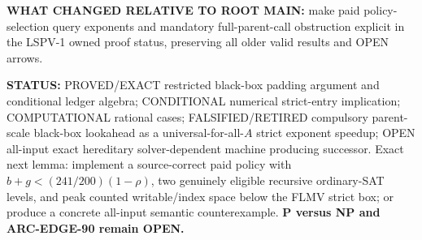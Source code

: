 \documentclass[11pt]{article}
\begin{document}
\textbf{WHAT CHANGED RELATIVE TO ROOT MAIN:} make paid policy-selection query exponents and mandatory full-parent-call obstruction explicit in the LSPV-1 owned proof status, preserving all older valid results and OPEN arrows.

\textbf{STATUS:} PROVED/EXACT restricted black-box padding argument and conditional ledger algebra; CONDITIONAL numerical strict-entry implication; COMPUTATIONAL rational cases; FALSIFIED/RETIRED compulsory parent-scale black-box lookahead as a universal-for-all-$A$ strict exponent speedup; OPEN all-input exact hereditary solver-dependent machine producing successor. Exact next lemma: implement a source-correct paid policy with $b+g<(241/200)(1-\rho)$, two genuinely eligible recursive ordinary-SAT levels, and peak counted writable/index space below the FLMV strict box; or produce a concrete all-input semantic counterexample. \textbf{P versus NP and ARC-EDGE-90 remain OPEN.}
\end{document}
